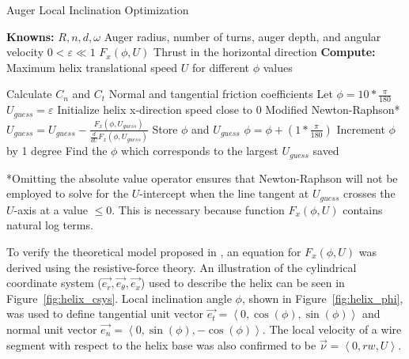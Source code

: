 \documentclass[letterpaper, 11 pt]{article}
\begin{document}
\begin{algorithm}[H]
	\caption{Auger Local Inclination Optimization}
	\label{augerOpt}
	
	\begin{algorithmic} %
	\State \textbf{Knowns:}
	\State $R, n, d, \omega$ \Comment Auger radius, number of turns, auger depth, and angular velocity
	\State $0<\varepsilon \ll 1$
	\State $F_x(\phi,U)$ \Comment Thrust in the horizontal direction
	\State
	\State \textbf{Compute:} Maximum helix translational speed $U$ for different $\phi$ values
	\end{algorithmic}
	
	\begin{algorithmic}[1] %
	\State Calculate $C_n$ and $C_t$ \Comment Normal and tangential friction coefficients 
	\State Let $\phi = 10*\frac{\pi}{180}$
		\State $U_{guess} = \varepsilon$ \Comment Initialize helix x-direction speed close to 0 
		 \Comment Modified Newton-Raphson*
			\State $U_{guess} = U_{guess} - \frac{F_x(\phi, U_{guess})}{\frac{d}{dU}F_x(\phi,U_{guess})}$
		\EndWhile
		\State Store $\phi$ and $U_{guess}$ 
		\State $\phi = \phi + (1*\frac{\pi}{180})$ \Comment Increment $\phi$ by 1 degree
	\EndWhile
	\State Find the $\phi$ which corresponds to the largest $U_{guess}$ saved
	\end{algorithmic}
\end{algorithm}
*Omitting the absolute value operator ensures that Newton-Raphson will not be employed to solve for the $U$-intercept when the line tangent at $U_{guess}$ crosses the $U$-axis at a value $\leq 0$. This is necessary because function $F_x(\phi,U)$ contains natural log terms.       
 
\medskip
To verify the theoretical model proposed in \cite{Melo}, an equation for $F_x(\phi,U)$ was derived using the resistive-force theory. An illustration of the cylindrical coordinate system ($\vec{e_r}, \vec{e_\theta}, \vec{e_x}$) used to describe the helix can be seen in Figure~\ref{fig:helix_csys}. Local inclination angle $\phi$, shown in Figure~\ref{fig:helix_phi}, was used to define tangential unit vector $\vec{e_t} = \left\langle 0, \cos(\phi),\sin(\phi)\right\rangle $ and normal unit vector $\vec{e_n} = \left\langle 0, \sin(\phi), -\cos(\phi)\right\rangle $. The local velocity of a wire segment with respect to the helix base was also confirmed to be $\vec{\nu} = \left\langle 0, rw, U\right\rangle $.
\end{document}

